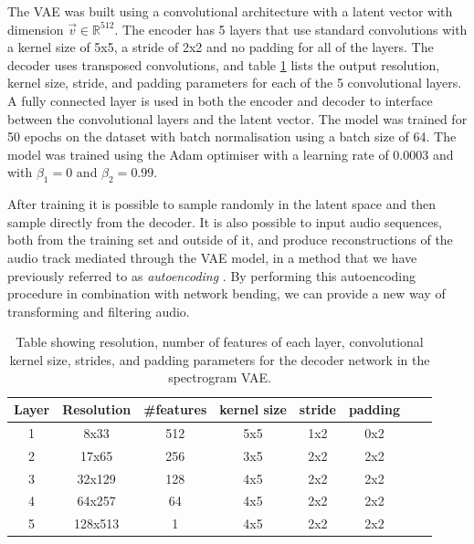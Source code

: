 The VAE was built using a convolutional architecture with a latent vector with dimension $\vec{v} \in \mathbb{R}^{512}$. The encoder has 5 layers that use standard convolutions with a kernel size of 5x5, a stride of 2x2 and no padding for all of the layers. The decoder uses transposed convolutions, and table \ref{tab:c5:decoder-architecture} lists the output resolution, kernel size, stride, and padding parameters for each of the 5 convolutional layers. A fully connected layer is used in both the encoder and decoder to interface between the convolutional layers and the latent vector. The model was trained for 50 epochs on the dataset with batch normalisation using a batch size of 64. The model was trained using the Adam optimiser \citep{kingma2014adam} with a learning rate of 0.0003 and with $\beta_1 = 0$ and $\beta_2 = 0.99$.

After training it is possible to sample randomly in the latent space and then sample directly from the decoder. It is also possible to input audio sequences, both from the training set and outside of it, and produce reconstructions of the audio track mediated through the VAE model, in a method that we have previously referred to as \textit{autoencoding} \citep{broad2017autoencoding}. By performing this autoencoding procedure in combination with network bending, we can provide a new way of transforming and filtering audio.

\begin{table}[]
    \centering
    \begin{tabular}{|c|c|c|c|c|c|c|c|}
    \hline
    Layer & Resolution & \#features & kernel size & stride & padding \\
    \hline
    1     & 8x33       & 512        & 5x5         & 1x2     & 0x2  \\
    2     & 17x65      & 256        & 3x5         & 2x2     & 2x2 \\
    3     & 32x129     & 128        & 4x5         & 2x2     & 2x2 \\
    4     & 64x257     & 64         & 4x5         & 2x2     & 2x2  \\
    5     & 128x513    & 1          & 4x5         & 2x2     & 2x2  \\
    \hline
    \end{tabular}
    \medskip
    \caption{\label{tab:c5:decoder-architecture}Table showing resolution, number of features of each layer, convolutional kernel size, strides, and padding parameters for the decoder network in the spectrogram VAE.
    }
    \end{table}

